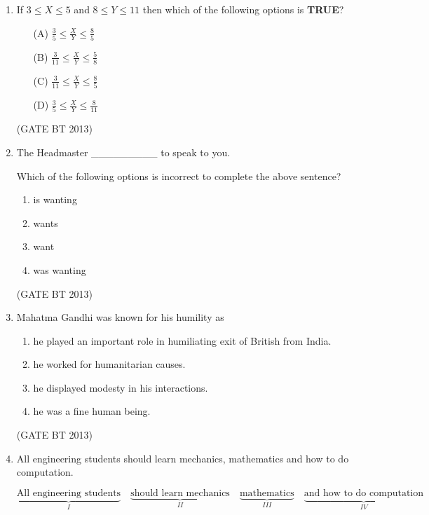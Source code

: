 \documentclass[journal,12pt,onecolumn]{IEEEtran}
\theoremstyle{remark}
\begin{document}
\begin{enumerate}
\item 
If \(3 \le X \le 5\) and \(8 \le Y \le 11\) then which of the following options is \textbf{TRUE}?

\begin{enumerate}
    \item[(A)] \(\frac{3}{5} \le \frac{X}{Y} \le \frac{8}{5}\)
    \item[(B)] \(\frac{3}{11} \le \frac{X}{Y} \le \frac{5}{8}\)
    \item[(C)] \(\frac{3}{11} \le \frac{X}{Y} \le \frac{8}{5}\)
    \item[(D)] \(\frac{3}{5} \le \frac{X}{Y} \le \frac{8}{11}\)
\end{enumerate} \hfill(GATE BT 2013)

\item 

The Headmaster \_\_\_\_\_\_\_\_\_ to speak to you. 

Which of the following options is incorrect to complete the above sentence?

\begin{enumerate}
    \item is wanting
    \item wants
    \item want
    \item was wanting
\end{enumerate} \hfill(GATE BT 2013)

\item 

Mahatma Gandhi was known for his humility as

\begin{enumerate}
    \item he played an important role in humiliating exit of British from India.
    \item he worked for humanitarian causes.
    \item he displayed modesty in his interactions.
    \item he was a fine human being.
\end{enumerate} \hfill(GATE BT 2013)

\item 

All engineering students should learn mechanics, mathematics and how to do computation.

\[
\underbrace{\text{All engineering students}}_{I} \quad
\underbrace{\text{should learn mechanics}}_{II} \quad
\underbrace{\text{mathematics}}_{III} \quad
\underbrace{\text{and how to do computation}}_{IV}
\]


\end{enumerate}
\end{document}
